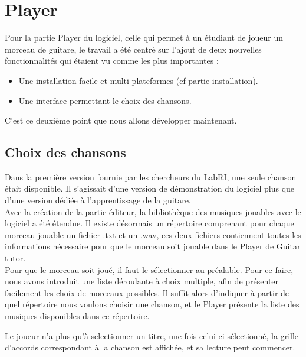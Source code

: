 \chapter{Player}

\indent Pour la partie Player du logiciel, celle qui permet à un étudiant de joueur un morceau de guitare, le travail a été centré sur l'ajout de deux nouvelles fonctionnalités
qui étaient vu comme les plus importantes :\\
\begin{itemize}
\item Une installation facile et multi plateformes (cf partie installation).
\item Une interface permettant le choix des chansons.\\
\end{itemize}
\indent C'est ce deuxième point que nous allons développer maintenant.\\


\section{Choix des chansons}
\indent Dans la première version fournie par les chercheurs du LabRI, une seule 
chanson était disponible. Il s'agissait d'une version de démonstration du 
logiciel plus que d'une version dédiée à l'apprentissage de la guitare.
\\
\indent Avec la création de la partie éditeur, la bibliothèque des musiques jouables avec le logiciel a été étendue.
Il existe désormais un répertoire comprenant pour chaque morceau jouable un fichier .txt et un .wav, ces deux fichiers contiennent toutes les informations nécessaire pour que le morceau soit jouable dans le Player de Guitar tutor. 
\\
\indent Pour que le morceau soit joué, il faut le sélectionner au préalable. Pour ce faire, nous avons introduit une liste déroulante à choix multiple, afin de présenter facilement les choix de morceaux possibles. 
Il suffit alors d'indiquer à partir de quel répertoire nous voulons choisir une chanson, et le Player présente la liste des musiques disponibles dans ce répertoire. 

\indent Le joueur n'a plus qu'à selectionner un titre, une fois celui-ci sélectionné, la grille d'accords correspondant à la chanson est affichée, et sa lecture peut commencer.

